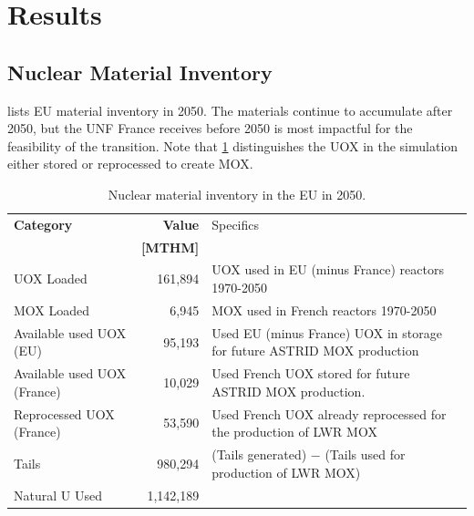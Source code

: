 \section{Results}

\subsection{Nuclear Material Inventory}

lists \gls{EU} material inventory in 2050.
The materials continue to accumulate after 2050, but the
\gls{UNF} France receives before 2050 is most impactful for the
feasibility of the transition. Note that \cref{tab:sim_result1} 
distinguishes the
\gls{UOX} in the simulation either stored or reprocessed to create \gls{MOX}.


\begin{table}[h]
	\centering
	\caption{Nuclear material inventory in the \gls{EU} in 2050.}
\begin{tabularx}{\textwidth}{XrX}
			\hline
                        \textbf{Category} & \textbf{Value} & Specifics \\
                                          & \textbf{[MTHM]} & \\ \hline
                        UOX Loaded  & 161,894 & UOX used in EU (minus France) reactors 1970-2050\\ 
			MOX Loaded  & 6,945  & MOX used in French reactors 1970-2050\\
                        Available used UOX (EU)  & 95,193  & Used EU (minus France) 
                                UOX in storage for future ASTRID MOX 
                                production\\
                        Available used UOX (France) & 
                                10,029  & Used French UOX stored for 
                                future ASTRID MOX production. \\
                                Reprocessed UOX (France) & 53,590 & Used French UOX already reprocessed for the production of LWR MOX \\
			Tails  & 980,294  & (Tails generated) $-$ (Tails used for production of LWR MOX) \\ 
			Natural U Used  & 1,142,189  & \\ \hline
		\end{tabularx}
		
		\label{tab:sim_result1}
\end {table}
\FloatBarrier


